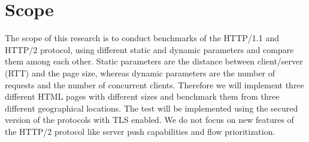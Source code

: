 \section{Scope}
\label{scope}
The scope of this research is to conduct benchmarks of the HTTP/1.1 and HTTP/2 protocol, using different static and dynamic parameters and compare them among each other. Static parameters are the distance between client/server (RTT) and the page size, whereas dynamic parameters are the number of requests and the number of concurrent clients. Therefore we will implement three different HTML pages with different sizes and benchmark them from three different geographical locations. The test will be implemented using the secured version of the protocols with TLS enabled. We do not focus on new features of the HTTP/2 protocol like server push capabilities and flow prioritization.  

